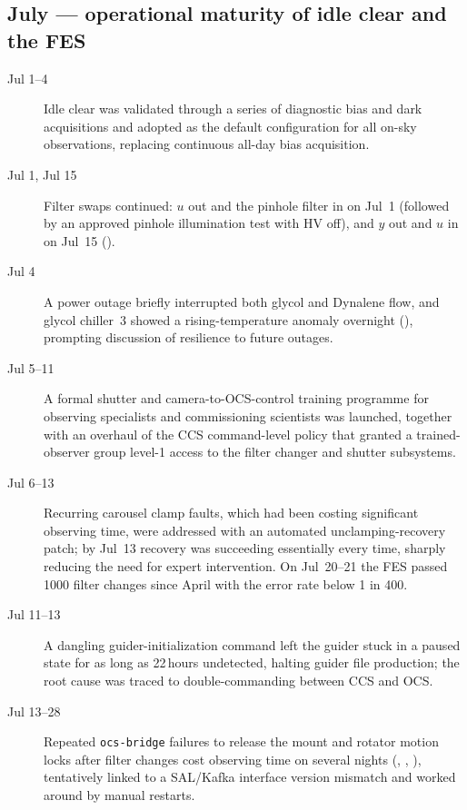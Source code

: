 \subsection{July --- operational maturity of idle clear and the FES}
\begin{description}
\item[Jul 1--4] Idle clear was validated through a series of
  diagnostic bias and dark acquisitions and adopted as the default
  configuration for all on-sky observations, replacing continuous
  all-day bias acquisition.

\item[Jul 1, Jul 15] Filter swaps continued: $u$ out and the pinhole
  filter in on Jul~1 (followed by an approved pinhole illumination
  test with HV off), and $y$ out and $u$ in on Jul~15
  ().

\item[Jul 4] A power outage briefly interrupted both glycol and
  Dynalene flow, and glycol chiller~3 showed a rising-temperature
  anomaly overnight (), prompting discussion of resilience to
  future outages.

\item[Jul 5--11] A formal shutter and camera-to-OCS-control training
  programme for observing specialists and commissioning scientists was
  launched, together with an overhaul of the CCS command-level policy
  that granted a trained-observer group level-1 access to the filter
  changer and shutter subsystems.

\item[Jul 6--13] Recurring carousel clamp faults, which had been
  costing significant observing time, were addressed with an automated
  unclamping-recovery patch; by Jul~13 recovery was succeeding
  essentially every time, sharply reducing the need for expert
  intervention.  On Jul~20--21 the FES passed 1000 filter changes
  since April with the error rate below 1 in 400.

\item[Jul 11--13] A dangling guider-initialization command left the
  guider stuck in a paused state for as long as 22\,hours undetected,
  halting guider file production; the root cause was traced to
  double-commanding between CCS and OCS.

\item[Jul 13--28] Repeated \texttt{ocs-bridge} failures to release the
  mount and rotator motion locks after filter changes cost observing
  time on several nights (, , ), tentatively
  linked to a SAL/Kafka interface version mismatch and worked around
  by manual restarts.


\end{description}
